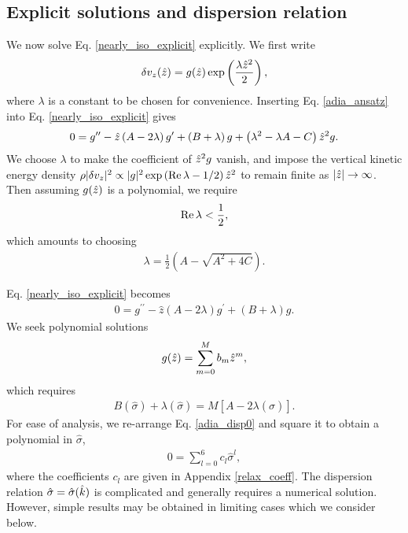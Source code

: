 \subsection{Explicit solutions and dispersion relation}\label{disp_relax}
We now solve Eq. \ref{nearly_iso_explicit} explicitly. We first write  
\begin{align}
  \delta v_z(\hat{z}) =
  g(\hat{z})\exp\left(\frac{\lambda\hat{z}^2}{2}\right), \label{adia_ansatz}
\end{align}
where $\lambda$ is a constant to be chosen for convenience. Inserting
Eq. \ref{adia_ansatz} into Eq. \ref{nearly_iso_explicit} gives
\begin{align}
  0 = g^{\prime\prime} - \hat{z}\left(A - 2\lambda\right)g^\prime + \left(B +
    \lambda\right)g
  +\left(\lambda^2 - \lambda A - C\right)\hat{z}^2 g.
\end{align}
We choose $\lambda$ to make the coefficient of $\hat{z}^2g$
vanish, and impose the vertical kinetic energy density
$\rho|\delta v_z|^2\propto |g|^2 \exp{\left(\operatorname{Re}\lambda -
    1/2\right)\hat{z}^2}$ to remain finite as $|\hat{z}|\to\infty$. 
Then assuming $g(\hat{z})$ is a polynomial, we require  
\begin{align}
  \operatorname{Re}\lambda < \frac{1}{2}, 
\end{align}
which amounts to choosing 
\begin{align}
  \lambda = \frac{1}{2}\left(A - \sqrt{A^2 + 4C}\right).  
\end{align} 


Eq. \ref{nearly_iso_explicit} becomes 
\begin{align}
  0 = g^{\prime\prime} - \hat{z}\left(A - 2\lambda\right)g^\prime +
  \left(B + \lambda\right)g.
\end{align}
We seek polynomial solutions 
\begin{align}
  g(\hat{z}) = \sum_{m=0}^M b_m \hat{z}^m,
\end{align}
which requires
\begin{align}
  B(\hat{\sigma}) + \lambda(\hat{\sigma}) =
  M\left[A-2\lambda(\hat{\sigma})\right].\label{adia_disp0} 
\end{align}
For ease of analysis, we re-arrange Eq. \ref{adia_disp0} and square it
to obtain a polynomial in $\hat{\sigma}$,  
\begin{align}
  0 = \sum_{l=0}^{6}c_l\hat{\sigma}^l,\label{relax_disp}
\end{align}
where the coefficients $c_l$ are given in Appendix \ref{relax_coeff}.
The dispersion relation $\hat{\sigma}=\hat{\sigma}(\hat{k})$ is
complicated and generally requires a numerical solution. However,
simple results may be obtained in limiting cases which we consider
below.  

